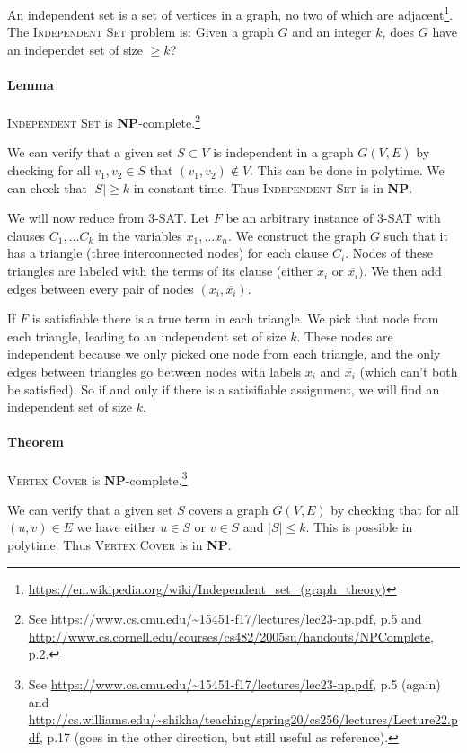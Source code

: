 \documentclass{article}
\begin{document}
An independent set is a set of vertices in a graph, no two of which are adjacent\footnote{\url{https://en.wikipedia.org/wiki/Independent_set_(graph_theory)}}. The \textsc{Independent Set} problem is: Given a graph $G$ and an integer $k$, does $G$ have an independet set of size $\geq k$?

\paragraph{Lemma} \textsc{Independent Set} is \textbf{NP}-complete.\footnote{See \url{https://www.cs.cmu.edu/~15451-f17/lectures/lec23-np.pdf}, p.5 and \url{http://www.cs.cornell.edu/courses/cs482/2005su/handouts/NPComplete}, p.2.}

We can verify that a given set $S \subset V$ is independent in a graph $G(V, E)$ by checking for all $v_1, v_2 \in S$ that $(v_1, v_2) \not\in V$. This can be done in polytime. We can check that $|S| \geq k$ in constant time. Thus \textsc{Independent Set} is in \textbf{NP}.

We will now reduce from 3-SAT. Let $F$ be an arbitrary instance of 3-SAT with clauses $C_1, \ldots C_k$ in the variables $x_1, \ldots x_n$. We construct the graph $G$ such that it has a triangle (three interconnected nodes) for each clause $C_i$. Nodes of these triangles are labeled with the terms of its clause (either $x_i$ or $\overline{x_i})$. We then add edges between every pair of nodes $(x_i, \overline{x_i})$.

If $F$ is satisfiable there is a true term in each triangle. We pick that node from each triangle, leading to an independent set of size $k$. These nodes are independent because we only picked one node from each triangle, and the only edges between triangles go between nodes with labels $x_i$ and $\overline{x_i}$ (which can't both be satisfied). So if and only if there is a satisifiable assignment, we will find an independent set of size $k$.

\paragraph{Theorem} \textsc{Vertex Cover} is \textbf{NP}-complete.\footnote{See \url{https://www.cs.cmu.edu/~15451-f17/lectures/lec23-np.pdf}, p.5 (again) and \url{http://cs.williams.edu/~shikha/teaching/spring20/cs256/lectures/Lecture22.pdf}, p.17 (goes in the other direction, but still useful as reference).}

We can verify that a given set $S$ covers a graph $G(V, E)$ by checking that for all $(u, v) \in E$ we have either $u \in S$ or $v \in S$ and $|S| \leq k$. This is possible in polytime. Thus \textsc{Vertex Cover} is in \textbf{NP}.
\end{document}
